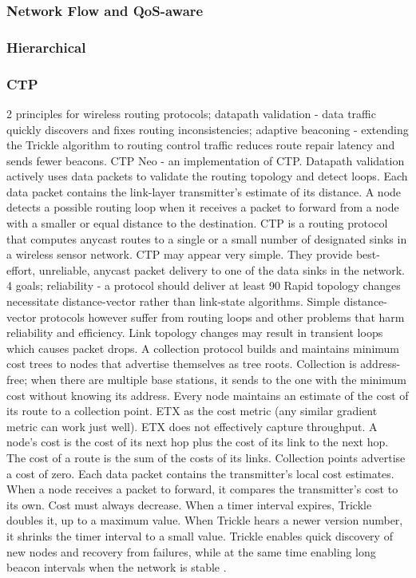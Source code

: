 \subsubsection{Network Flow and QoS-aware}

\subsubsection{Hierarchical}
\subsubsection*{CTP}
2 principles for wireless routing protocols; datapath validation - data traffic quickly discovers and fixes routing inconsistencies; adaptive beaconing - extending the Trickle algorithm to routing control traffic reduces route repair latency and sends fewer beacons. CTP Neo - an implementation of CTP.
Datapath validation actively uses data packets to validate the routing topology and detect loops. Each data packet contains the link-layer transmitter’s estimate of its distance. A node detects a possible routing loop when it receives a packet to forward from a node with a smaller or equal distance to the destination.
CTP is a routing protocol that computes anycast routes to a single or a small number of designated sinks in a wireless sensor network. CTP may appear very simple. They provide best-effort, unreliable, anycast packet delivery to one of the data sinks in the network. 
4 goals; reliability - a protocol should deliver at least 90%
Rapid topology changes necessitate distance-vector rather than link-state algorithms. Simple distance-vector protocols however suffer from routing loops and other problems that harm reliability and efficiency. Link topology changes may result in transient loops which causes packet drops. A collection protocol builds and maintains minimum cost trees to nodes that advertise themselves as tree roots. Collection is address-free; when there are multiple base stations, it sends to the one with the minimum cost without knowing its address.
Every node maintains an estimate of the cost of its route to a collection point. ETX as the cost metric (any similar gradient metric can work just well). ETX does not effectively capture throughput. A node’s cost is the cost of its next hop plus the cost of its link to the next hop. The cost of a route is the sum of the costs of its links. Collection points advertise a cost of zero. Each data packet contains the transmitter’s local cost estimates. When a node receives a packet to forward, it compares the transmitter’s cost to its own. Cost must always decrease. 
When a timer interval expires, Trickle doubles it, up to a maximum value. When Trickle hears a newer version number, it shrinks the timer interval to a small value. Trickle enables quick discovery of new nodes and recovery from failures, while at the same time enabling long beacon intervals when the network is stable \cite{ctp}. 


